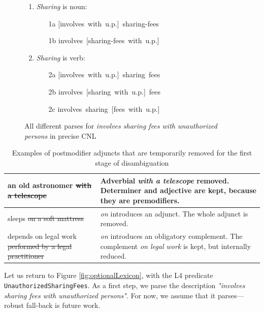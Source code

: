 \documentclass[11pt]{article}
\begin{document}
\begin{figure}
  \begin{enumerate}
    \item \textit{Sharing} is noun:
       \begin{itemize}
            \item[1a] [involves~with~u.p.]~sharing-fees
            \item[1b] involves~[sharing-fees~with~u.p.]
       \end{itemize}
    \item \textit{Sharing} is verb:
        \begin{itemize}

           \item[2a] [involves~with~u.p.]~sharing~fees
           \item[2b] involves~[sharing~with~u.p.]~fees
           \item[2c] involves~sharing~[fees~with~u.p.]
        \end{itemize}
\end{enumerate}
\caption{All different parses for {\it involves sharing fees with unauthorized persons} in precise CNL}
\label{fig:parses}
\end{figure}


\begin{table}[t]
\centering
\begin{tabular}{|p{}|p{}|}
\hline
an old astronomer \sout{with a telescope} & Adverbial \textit{with a telescope} removed. Determiner and adjective are kept, because they are premodifiers. \\ 
\hline
sleeps \sout{on a soft mattress}        & \textit{on} introduces an adjunct. The whole adjunct is removed.             \\ 
\hline
depends on legal work \sout{performed by a legal practitioner} & \textit{on} introduces an obligatory complement. The complement \textit{on legal work} is kept, but internally reduced. \\ %
\hline
\end{tabular}
\caption{Examples of postmodifier adjuncts that are temporarily removed for the first stage of disambiguation}
\label{tab:removeAdjuncts}
\end{table}


Let us return to Figure \ref{fig:optionalLexicon}, with the L4 predicate {\small \texttt{UnauthorizedSharingFees}}.
As a first step, we parse the description \textit{"involves sharing fees with unauthorized persons"}. 
For now, we assume that it parses---robust fall-back is future work. %
\end{document}
